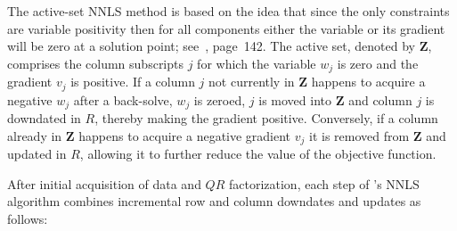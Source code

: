 The active-set NNLS method is based on the idea that since the only constraints are variable positivity
then for all components either the variable or its gradient will be zero at a solution point; see~\cite{BoVa}, page~142.
The active set, denoted by \textbf{Z}, comprises the column subscripts $j$ for which the variable $w_j$ is zero and the gradient $v_j$ is positive. If a column $j$ not currently in \textbf{Z} happens to acquire a negative $w_j$ after a back-solve, $w_j$ is zeroed,
$j$ is moved into \textbf{Z} and column $j$ is downdated in $R$, thereby making the gradient positive.
Conversely, if a column already in \textbf{Z} happens to acquire a negative gradient $v_j$ it is removed from \textbf{Z} and updated in $R$,
allowing it to further reduce the value of the objective function.

After initial acquisition of data and $QR$ factorization, each step of \pacora's NNLS algorithm
combines incremental row and column downdates and updates as follows:

